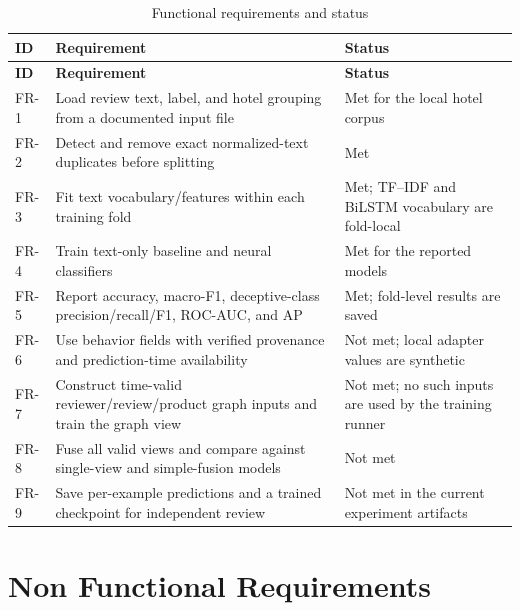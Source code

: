 \documentclass[12pt,a4paper]{report}
\begin{document}
\begin{longtable}{p{}p{}p{}}
\caption{Functional requirements and status}\label{tab:functional}\\
\toprule
\textbf{ID} & \textbf{Requirement} & \textbf{Status} \\
\midrule
\endfirsthead
\toprule
\textbf{ID} & \textbf{Requirement} & \textbf{Status} \\
\midrule
\endhead
FR-1 & Load review text, label, and hotel grouping from a documented input file & Met for the local hotel corpus \\
FR-2 & Detect and remove exact normalized-text duplicates before splitting & Met \\
FR-3 & Fit text vocabulary/features within each training fold & Met; TF--IDF and BiLSTM vocabulary are fold-local \\
FR-4 & Train text-only baseline and neural classifiers & Met for the reported models \\
FR-5 & Report accuracy, macro-F1, deceptive-class precision/recall/F1, ROC-AUC, and AP & Met; fold-level results are saved \\
FR-6 & Use behavior fields with verified provenance and prediction-time availability & Not met; local adapter values are synthetic \\
FR-7 & Construct time-valid reviewer/review/product graph inputs and train the graph view & Not met; no such inputs are used by the training runner \\
FR-8 & Fuse all valid views and compare against single-view and simple-fusion models & Not met \\
FR-9 & Save per-example predictions and a trained checkpoint for independent review & Not met in the current experiment artifacts \\
\bottomrule
\end{longtable}

\section{Non Functional Requirements}
\end{document}
